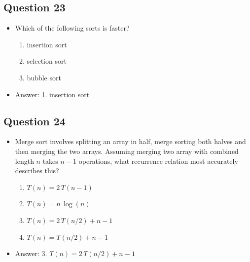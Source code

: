 \begin{slide}
\section[-1]{Question 23}

\begin{PauseHighLight}
  \begin{itemize}
  \item Which of the following sorts is faster?
    \begin{enumerate}
    \item insertion sort
    \item selection sort
    \item bubble sort\pause
    \end{enumerate}
  \item Answer: 1. insertion sort\pauseb
  \end{itemize}
\end{PauseHighLight}
\end{slide}

\begin{slide}
\section[-1]{Question 24}

\begin{PauseHighLight}
  \begin{itemize}
  \item Merge sort involves splitting an array in half, merge sorting both halves and then merging the two arrays.  Assuming merging two array with combined length $n$ takes $n-1$ operations, what recurrence relation most accurately describes this?
    \begin{enumerate}
    \item $T(n) = 2\, T(n-1)$
    \item $T(n) = n\, \log(n)$
    \item $T(n) = 2\, T(n/2) + n-1$
    \item $T(n) = T(n/2) + n-1$\pause
    \end{enumerate}
  \item Answer: 3. $T(n) = 2\, T(n/2) + n-1$\pauseb
  \end{itemize}
\end{PauseHighLight}
\end{slide}

